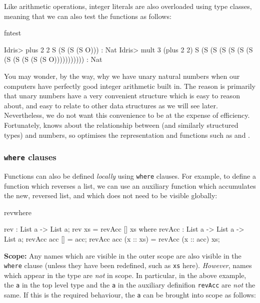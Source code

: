 Like arithmetic operations, integer literals are also overloaded using type classes, 
meaning that we can also test the functions as follows:

\begin{SaveVerbatim}{fntest}

Idris> plus 2 2 
S (S (S (S O))) : Nat
Idris> mult 3 (plus 2 2)
S (S (S (S (S (S (S (S (S (S (S (S O))))))))))) : Nat

\end{SaveVerbatim}

You may wonder, by the way, why we have unary natural numbers when our
computers have perfectly good integer arithmetic built in. The reason is
primarily that unary numbers have a very convenient structure which is easy to
reason about, and easy to relate to other data structures as we will see later.
Nevertheless, we do not want this convenience to be at the expense of
efficiency. Fortunately, \Idris{} knows about the relationship between
 (and similarly structured types) and numbers, so optimises the
representation and functions such as  and .

\subsubsection*{\texttt{where} clauses}

Functions can also be defined \emph{locally} using \texttt{where} clauses. For example,
to define a function which reverses a list, we can use an auxiliary function which
accumulates the new, reversed list, and which does not need to be visible globally:

\begin{SaveVerbatim}{revwhere}

rev : List a -> List a;
rev xs = revAcc [] xs where {
  revAcc : List a -> List a -> List a;
  revAcc acc [] = acc;
  revAcc acc (x :: xs) = revAcc (x :: acc) xs;
}

\end{SaveVerbatim}

\noindent
\textbf{Scope:} 
Any names which are visible in the outer scope are also visible in the \texttt{where}
clause (unless they have been redefined, such as \texttt{xs} here).
\emph{However}, names which appear in the type are \emph{not} in scope. In particular,
in the above example, the \texttt{a} in the top level type and the \texttt{a} in the
auxiliary definifion \texttt{revAcc} are \emph{not} the same. If this is the required
behaviour, the \texttt{a} can be brought into scope as follows:

